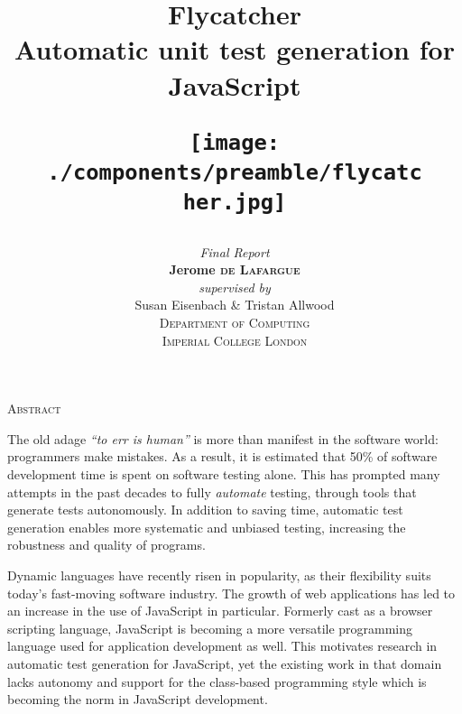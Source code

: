 \title
{
	{\Huge \textsf{Flycatcher} \\[0.2cm]}
	{\large \textsf{Automatic unit test generation for JavaScript}\\[0.5cm]}
	\begin{figure}[h]
		\centering
		\texttt{[image: ./components/preamble/flycatcher.jpg]}
	\end{figure}
}
\author
{	
	{\emph{Final Report}}\\[6.5cm]
	{\large \textbf{Jerome \textsc{de Lafargue}}}\\[0.2cm]
	\emph{supervised by}\\
	Susan Eisenbach \& Tristan Allwood\\[1cm]
	\textsc{\normalsize Department of Computing}\\
	\textsc{\large Imperial College London}
}


\date{}
\pagestyle{empty}
\maketitle


\newpage
\mbox{}

\begin{center}
\textsc{\LARGE Abstract}\\[1.4cm]
\end{center}

The old adage \emph{``to err is human''} is more than manifest in the software world: programmers make mistakes. As a result, it is estimated that 50\% of software development time is spent on software testing alone. This has prompted many attempts in the past decades to fully \emph{automate} testing, through tools that generate tests autonomously. In addition to saving time, automatic test generation enables more systematic and unbiased testing, increasing the robustness and quality of programs.

Dynamic languages have recently risen in popularity, as their flexibility suits today's fast-moving software industry. The growth of web applications has led to an increase in the use of JavaScript in particular. Formerly cast as a browser scripting language, JavaScript is becoming a more versatile programming language used for application development as well. This motivates research in automatic test generation for JavaScript, yet the existing work in that domain \cite{contract-driven,alshraideh2008complete,saxena2010symbolic} lacks autonomy and support for the class-based programming style which is becoming the norm in JavaScript development.


